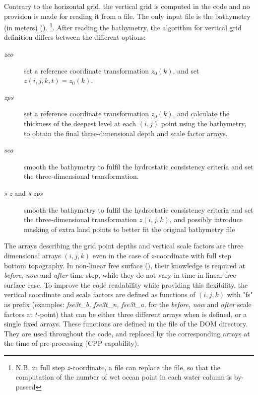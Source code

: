 \documentclass[NEMO_book]{subfiles}
\begin{document}
{Contrary to the horizontal grid, the vertical grid is computed in the code and no 
provision is made for reading it from a file. The only input file is the bathymetry 
(in meters) (). 
\footnote{N.B. in full step $z$-coordinate, a  file can replace the 
 file, so that the computation of the number of wet ocean point 
in each water column is by-passed}. 
After reading the bathymetry, the algorithm for vertical grid definition differs 
between the different options:
\begin{description}
\item[\textit{zco}] set a reference coordinate transformation $z_0 (k)$, and set $z(i,j,k,t)=z_0 (k)$.
\item[\textit{zps}] set a reference coordinate transformation $z_0 (k)$, and 
calculate the thickness of the deepest level at each $(i,j)$ point using the 
bathymetry, to obtain the final three-dimensional depth and scale factor arrays.
\item[\textit{sco}] smooth the bathymetry to fulfil the hydrostatic consistency 
criteria and set the three-dimensional transformation.
\item[\textit{s-z} and \textit{s-zps}] smooth the bathymetry to fulfil the hydrostatic 
consistency criteria and set the three-dimensional transformation $z(i,j,k)$, and 
possibly introduce masking of extra land points to better fit the original bathymetry file
\end{description}

The arrays describing the grid point depths and vertical scale factors 
are three dimensional arrays $(i,j,k)$ even in the case of $z$-coordinate with 
full step bottom topography. In non-linear free surface (), their knowledge
is required at \textit{before}, \textit{now} and \textit{after} time step, while they 
do not vary in time in linear free surface case. 
To improve the code readability while providing this flexibility, the vertical coordinate 
and scale factors are defined as functions of 
$(i,j,k)$ with "fs" as prefix (examples: \textit{fse3t\_b, fse3t\_n, fse3t\_a,} 
for the  \textit{before}, \textit{now} and \textit{after} scale factors at $t$-point) 
that can be either three different arrays when  is defined, or a single fixed arrays. 
These functions are defined in the file  of the DOM directory. 
They are used throughout the code, and replaced by the corresponding arrays at 
the time of pre-processing (CPP capability).

}
\end{document}
